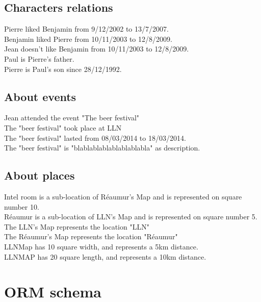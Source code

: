 \documentclass[a4paper ,12pt,french]{article}
\begin{document}
\subsection{Characters relations}
\noindent Pierre liked Benjamin from 9/12/2002 to 13/7/2007.\\
Benjamin liked Pierre from 10/11/2003 to 12/8/2009.\\
Jean doesn't like Benjamin from 10/11/2003 to 12/8/2009.\\
Paul is Pierre's father.\\
Pierre is Paul's son since 28/12/1992.\\


\subsection{About events}

\noindent Jean attended the event "The beer festival"\\
The "beer festival" took place at LLN\\
The "beer festival" lasted from 08/03/2014 to 18/03/2014.\\
The "beer festival" is "blablablablablablablabla" as description.


\subsection{About places}
\noindent Intel room is a sub-location of Réaumur's Map and is represented on square number 10.\\
Réaumur is a sub-location of  LLN's Map and is represented on square number  5.\\
The LLN's Map represents the location "LLN"\\
The Réaumur's Map represents the location "Réaumur"\\
LLNMap has 10 square width, and represents a 5km distance.\\
LLNMAP has 20 square length, and represents a 10km distance.

\section{ORM schema}
\end{document}
